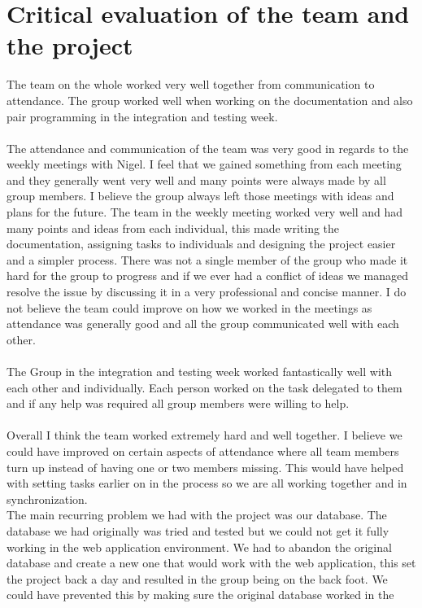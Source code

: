 \documentclass[titlepage]{article}
\begin{document}
{\section {Critical evaluation of the team and the project}
The team on the whole worked very well together from communication to attendance. The group worked well when working on
the documentation and also pair programming in the integration and testing week.
\\
\\
The attendance and communication of the team was very good in regards to the weekly
meetings with Nigel. I feel that we gained something from each meeting and they generally went very well and many points were always made by all group members.
I believe the group always left those meetings with ideas and plans for the future. The team in the weekly meeting worked very
well and had many points and ideas from each individual, this made writing the
documentation, assigning tasks to individuals and designing the project easier and a simpler process. There was not a single member of the group who
made it hard for the group to progress and if we ever had a conflict of ideas
we managed resolve the issue by discussing it in a very professional and concise manner. I do not
believe the team could improve on how we worked in the meetings as attendance was generally good
and all the group communicated well with each other.
\\
\\
The Group in the integration and testing week worked fantastically well with each other and
individually. Each person worked on the task delegated to them and if any help was
required all group members were willing to help.
\\
\\
Overall I think the team worked extremely hard and well together. I believe we could have
improved on certain aspects of attendance where all team members turn up instead of having one or two members missing. This
would have helped with setting tasks earlier on in the process so we are all working together and in synchronization.
\\
The main recurring problem we had with the project was our database. The database we had
originally was tried and tested but we could not get it fully working in the web application
environment. We had to abandon the original database and create a new one that would work
with the web application, this set the project back a day and  resulted in the group being on the
back foot. We could have prevented this by making sure the original database worked in the
}
\end{document}
